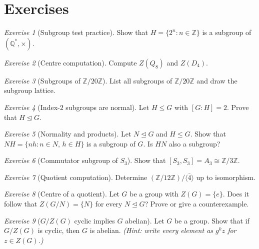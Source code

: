 \documentclass[12pt,a4paper,openany]{book}
\theoremstyle{definition}
\theoremstyle{remark}
\newtheorem{exercise}{Exercise}[chapter]
\newcommand{\Z}{\mathbb{Z}}
\newcommand{\Q}{\mathbb{Q}}
\begin{document}
\section{Exercises}
\label{sec:ch2-exercises}

\begin{exercise}[Subgroup test practice]
\label{exer:ch2-1}
Show that $H=\{2^n:n\in\Z\}$ is a subgroup of $(\Q^*,\times)$.
\end{exercise}

\begin{exercise}[Centre computation]
\label{exer:ch2-2}
Compute $Z(Q_8)$ and $Z(D_4)$.
\end{exercise}

\begin{exercise}[Subgroups of $\Z/20\Z$]
\label{exer:ch2-3}
List all subgroups of $\Z/20\Z$ and draw the subgroup lattice.
\end{exercise}

\begin{exercise}[Index-$2$ subgroups are normal]
\label{exer:ch2-4}
Let $H\le G$ with $[G:H]=2$.  Prove that $H\trianglelefteq G$.
\end{exercise}

\begin{exercise}[Normality and products]
\label{exer:ch2-5}
Let $N\trianglelefteq G$ and $H\le G$.  Show that $NH=\{nh:n\in N,\,
h\in H\}$ is a subgroup of $G$.  Is $HN$ also a subgroup?
\end{exercise}

\begin{exercise}[Commutator subgroup of $S_3$]
\label{exer:ch2-6}
Show that $[S_3,S_3]=A_3\cong\Z/3\Z$.
\end{exercise}

\begin{exercise}[Quotient computation]
\label{exer:ch2-7}
Determine $(\Z/12\Z)/\langle\bar 4\rangle$ up to isomorphism.
\end{exercise}

\begin{exercise}[Centre of a quotient]
\label{exer:ch2-8}
Let $G$ be a group with $Z(G)=\{e\}$.  Does it follow that
$Z(G/N)=\{N\}$ for every $N\trianglelefteq G$?  Prove or give a
counterexample.
\end{exercise}

\begin{exercise}[$G/Z(G)$ cyclic implies $G$ abelian]
\label{exer:ch2-9}
Let $G$ be a group.  Show that if $G/Z(G)$ is cyclic, then $G$ is abelian.
\textit{(Hint: write every element as $g^kz$ for $z\in Z(G)$.)}
\end{exercise}
\end{document}

